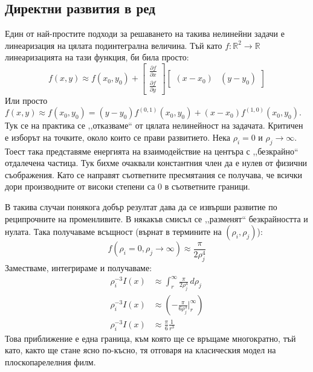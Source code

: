 \subsection{Директни развития в ред}
Един от най-простите подходи за решаването на такива нелинейни задачи е линеаризация на цялата подинтегрална величина. Тъй като $f: \mathbb{R}^2 \rightarrow \mathbb{R}$ линеаризацията на тази функция, би била просто:
\begin{equation*}
	f(x,y) \approx f(x_0,y_0) + \begin{bmatrix}
		\frac{\partial f}{\partial x} \\
		\frac{\partial f}{\partial y}
	\end{bmatrix}
	\begin{bmatrix}
		(x-x_0) & (y-y_0)
	\end{bmatrix}
\end{equation*}
Или просто $f(x,y) \approx f(x_0, y_0) = (y-y_0) f^{(0,1)}(x_0,y_0)+ (x-x_0) f^{(1,0)}(x_0,y_0)$.
Тук се на практика се ,,отказваме`` от цялата нелинейност на задачата. Критичен е изборът на точките, около които се прави развитието.
Нека $\rho_i = 0$ и $\rho_j \rightarrow \infty$. Тоест така представяме енергията на взаимодействие на центъра с ,,безкрайно`` отдалечена частица.
Тук бихме очаквали константния член да е нулев от физични съображения. Като се направят съответните пресмятания се получава, че всички дори производните от високи степени са 0 в съответните граници.

В такива случаи понякога добър резултат дава да се извърши развитие по реципрочните на променливите. В някакъв смисъл се ,,разменят`` безкрайността и нулата.
Така получаваме всъщност (върнат в термините на $(\rho_i, \rho_j)$):
\begin{equation*}
	f(\rho_i = 0, \rho_j \rightarrow \infty) \approx \frac{\pi}{2 \rho_{j}^4}
\end{equation*}
Заместваме, интегрираме и получаваме:
\begin{align*}
	\rho_{i}^{-3} I(x) & \approx \displaystyle\int_{r}^{\infty} \frac{\pi}{2 \rho_{j}^4}  \,d\rho_j \\
	\rho_{i}^{-3} I(x) & \approx  \left( -\frac{\pi }{6 \rho_j^3}\big|_{r}^{\infty}  \right)        \\
	\rho_{i}^{-3} I(x) & \approx \frac{\pi}{6} \frac{1}{r^3}
\end{align*}
Това приближение е една граница, към която ще се връщаме многократно, тъй като, както ще стане ясно по-късно, тя отговаря на класическия модел на плоскопарелелния филм.

